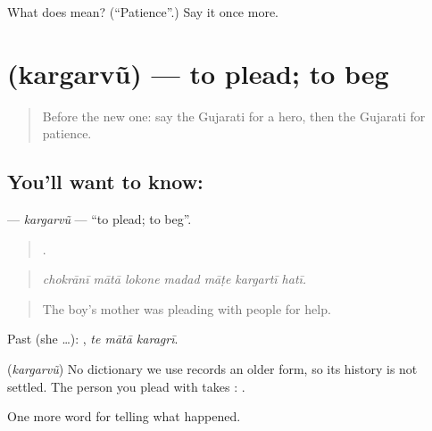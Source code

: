 \begin{tcolorbox}[breakable,colback=teal!4,colframe=teal!35!black,title={Before you move on}]
What does  mean? (\textquotedblleft{}Patience\textquotedblright{}.) Say it once more.
\end{tcolorbox}
\section[\texorpdfstring{\gu{કરગરવું} (kargarvũ)}{કરગરવું (kargarvũ)}]{ (kargarvũ) — to plead; to beg}

\label{lesson:GU-C308-kargarvu}



\begin{quote}
Before the new one: say the Gujarati for a hero, then the Gujarati for patience.
\end{quote}

\subsection*{You'll want to know: }
\textbf{} — \emph{kargarvũ} — \textquotedblleft{}to plead; to beg\textquotedblright{}.

\begin{quote}
      .
\end{quote}

\begin{quote}
\emph{chokrānī mātā lokone madad māṭe kargartī hatī.}
\end{quote}

\begin{quote}
The boy's mother was pleading with people for help.
\end{quote}

Past (she …):   , \emph{te mātā karagrī}.

\begin{cousinweb}
\textbf{} (\emph{kargarvũ}) No dictionary we use records an older form, so its history is not settled. The person you plead with takes \textbf{}: \textbf{  }.
\end{cousinweb}

\begin{grammarlens}[title={What you've built}]
One more word for telling what happened.
\end{grammarlens}

